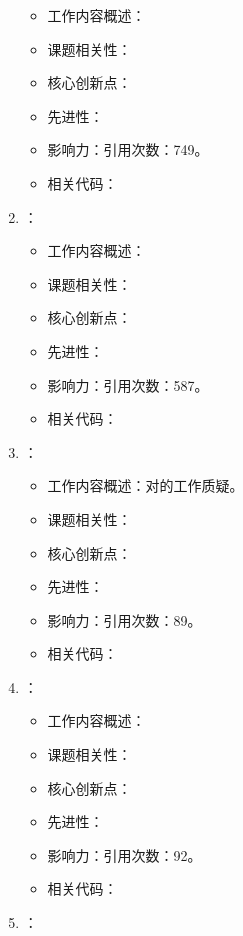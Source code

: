 \begin{enumerate}
\begin{itemize}
                \item 工作内容概述：
                \item 课题相关性：
                \item 核心创新点：
                \item 先进性：
                \item 影响力：引用次数：749。
                \item 相关代码：
            \end{itemize}
            \item \citet{ronnow2014defining}：
            \begin{itemize}
                \item 工作内容概述：
                \item 课题相关性：
                \item 核心创新点：
                \item 先进性：
                \item 影响力：引用次数：587。
                \item 相关代码：
            \end{itemize}
            \item \citet{smolin2014classical}：
            \begin{itemize}
                \item 工作内容概述：对\citet{boixo2014evidence}的工作质疑。
                \item 课题相关性：
                \item 核心创新点：
                \item 先进性：
                \item 影响力：引用次数：89。
                \item 相关代码：
            \end{itemize}
            \item \citet{king2015benchmarking}：
            \begin{itemize}
                \item 工作内容概述：
                \item 课题相关性：
                \item 核心创新点：
                \item 先进性：
                \item 影响力：引用次数：92。
                \item 相关代码：
            \end{itemize}
            \item \citet{heim2015quantum}：

\end{enumerate}
